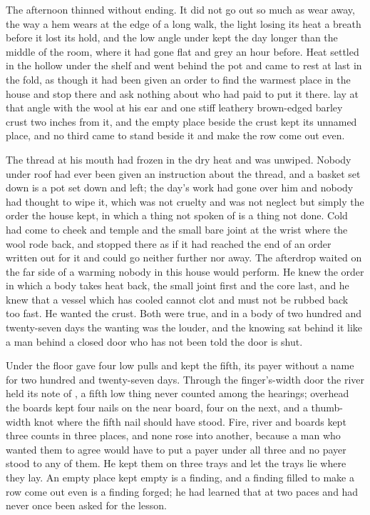 The afternoon thinned without ending. It did not go out so much as wear away, the way a hem wears at the edge of a long walk, the light losing its heat a breath before it lost its hold, and the low angle under  kept the day longer than the middle of the room, where it had gone flat and grey an hour before. Heat settled in the hollow under the shelf and went behind the pot and came to rest at last in the fold, as though it had been given an order to find the warmest place in the house and stop there and ask nothing about who had paid to put it there.  lay at that angle with the wool at his ear and one stiff leathery brown-edged barley crust two inches from it, and the empty place beside the crust kept its unnamed place, and no third came to stand beside it and make the row come out even.

The thread at his mouth had frozen in the dry heat and was unwiped. Nobody under  roof had ever been given an instruction about the thread, and a basket set down is a pot set down and left; the day's work had gone over him and nobody had thought to wipe it, which was not cruelty and was not neglect but simply the order the house kept, in which a thing not spoken of is a thing not done. Cold had come to cheek and temple and the small bare joint at the wrist where the wool rode back, and stopped there as if it had reached the end of an order written out for it and could go neither further nor away. The afterdrop waited on the far side of a warming nobody in this house would perform. He knew the order in which a body takes heat back, the small joint first and the core last, and he knew that a vessel which has cooled cannot clot and must not be rubbed back too fast. He wanted the crust. Both were true, and in a body of two hundred and twenty-seven days the wanting was the louder, and the knowing sat behind it like a man behind a closed door who has not been told the door is shut.

Under the floor  gave four low pulls and kept the fifth, its payer without a name for two hundred and twenty-seven days. Through the finger's-width door the river held its note of , a fifth low thing never counted among the hearings; overhead the boards kept four nails on the near board, four on the next, and a thumb-width knot where the fifth nail should have stood. Fire, river and boards kept three counts in three places, and none rose into another, because a man who wanted them to agree would have to put a payer under all three and no payer stood to any of them. He kept them on three trays and let the trays lie where they lay. An empty place kept empty is a finding, and a finding filled to make a row come out even is a finding forged; he had learned that at two paces and had never once been asked for the lesson.

